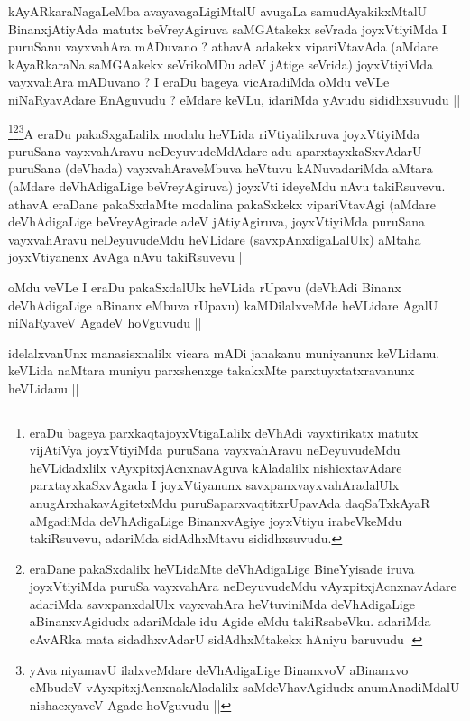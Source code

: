 \begin{artha}
kAyARkaraNagaLeMba avayavagaLigiMtalU avugaLa samudAyakikxMtalU BinanxjAtiyAda matutx beVreyAgiruva saMGAtakekx seVrada joyxVtiyiMda I puruSanu vayxvahAra mADuvano ? athavA adakekx vipariVtavAda (aMdare kAyaRkaraNa saMGAakekx seVrikoMDu adeV jAtige seVrida) joyxVtiyiMda vayxvahAra mADuvano ? I eraDu bageya vicAradiMda oMdu veVLe niNaRyavAdare EnAguvudu ? eMdare keVLu, idariMda yAvudu sididhxsuvudu ||
\end{artha}

\begin{artha}
\footnote{eraDu bageya parxkaqtajoyxVtigaLalilx deVhAdi vayxtirikatx matutx vijAtiVya joyxVtiyiMda puruSana vayxvahAravu neDeyuvudeMdu heVLidadxlilx vAyxpitxjAcnxnavAguva kAladalilx nishicxtavAdare parxtayxkaSxvAgada I joyxVtiyanunx savxpanxvayxvahAradalUlx anugArxhakavAgitetxMdu puruSaparxvaqtitxrUpavAda daqSaTxkAyaR aMgadiMda deVhAdigaLige BinanxvAgiye joyxVtiyu irabeVkeMdu takiRsuvevu, adariMda sidAdhxMtavu sididhxsuvudu.}\footnote{eraDane pakaSxdalilx heVLidaMte deVhAdigaLige BineYyisade iruva joyxVtiyiMda puruSa vayxvahAra neDeyuvudeMdu vAyxpitxjAcnxnavAdare adariMda savxpanxdalUlx vayxvahAra heVtuviniMda deVhAdigaLige aBinanxvAgidudx adariMdale idu Agide eMdu takiRsabeVku. adariMda cAvARka mata sidadhxvAdarU sidAdhxMtakekx hAniyu baruvudu |}\footnote{yAva niyamavU ilalxveMdare deVhAdigaLige BinanxvoV aBinanxvo eMbudeV vAyxpitxjAcnxnakAladalilx saMdeVhavAgidudx anumAnadiMdalU nishacxyaveV Agade hoVguvudu ||}A eraDu pakaSxgaLalilx modalu heVLida riVtiyalilxruva joyxVtiyiMda puruSana vayxvahAravu neDeyuvudeMdAdare adu aparxtayxkaSxvAdarU puruSana (deVhada) vayxvahAraveMbuva heVtuvu kANuvadariMda aMtara (aMdare deVhAdigaLige beVreyAgiruva) joyxVti ideyeMdu nAvu takiRsuvevu. athavA eraDane pakaSxdaMte modalina pakaSxkekx vipariVtavAgi (aMdare deVhAdigaLige beVreyAgirade adeV jAtiyAgiruva, joyxVtiyiMda puruSana vayxvahAravu neDeyuvudeMdu heVLidare (savxpAnxdigaLalUlx) aMtaha joyxVtiyanenx AvAga nAvu takiRsuvevu || 
\end{artha}

\begin{artha}
oMdu veVLe I eraDu pakaSxdalUlx heVLida rUpavu (deVhAdi Binanx deVhAdigaLige aBinanx eMbuva rUpavu) kaMDilalxveMde heVLidare AgalU niNaRyaveV AgadeV hoVguvudu ||
\end{artha}

\begin{artha}
idelalxvanUnx manasisxnalilx vicara mADi janakanu muniyanunx keVLidanu. keVLida naMtara muniyu parxshenxge takakxMte parxtuyxtatxravanunx heVLidanu ||
\end{artha}

